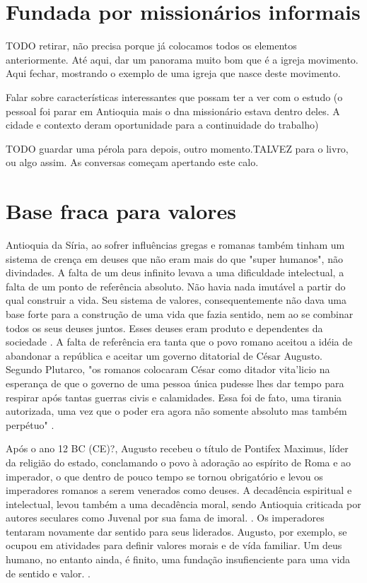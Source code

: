 \documentclass[
	12pt,				%
	openright,			%
	twoside,			%
	a4paper,			%
	english,			%
	french,				%
	spanish,			%
	brazil				%
	]{abntex2}
\begin{document}
\section{Fundada por missionários informais}
TODO retirar, não precisa porque já colocamos todos os elementos anteriormente. Até aqui, dar um panorama muito bom que é a igreja movimento. Aqui fechar, mostrando o exemplo de uma igreja que nasce deste movimento.

Falar sobre características interessantes que possam ter a ver com o estudo
(o pessoal foi parar em Antioquia mais o dna missionário estava dentro deles. A cidade e contexto deram oportunidade para a continuidade do trabalho)

TODO guardar uma pérola para depois, outro momento.TALVEZ para o livro, ou algo assim. As conversas começam apertando este calo.
\section{Base fraca para valores}

Antioquia da Síria, ao sofrer influências gregas e romanas também tinham um sistema de crença em deuses que não eram mais do que "super humanos", não divindades. A falta de um deus infinito levava a uma dificuldade intelectual, a falta de um ponto de referência absoluto. Não havia nada imutável a partir do qual construir a vida. Seu sistema de valores, consequentemente não dava uma base forte para a construção de uma vida que fazia sentido, nem ao se combinar todos os seus deuses juntos. Esses deuses eram produto e dependentes da sociedade \cite[19]{schaeffer}. A falta de referência era tanta que o povo romano aceitou a idéia de abandonar a república e aceitar um governo ditatorial de César Augusto. Segundo Plutarco, "os romanos colocaram César como ditador vita'licio na esperança de que o governo de uma pessoa única pudesse lhes dar tempo para respirar após tantas guerras civis e calamidades. Essa foi de fato, uma tirania autorizada, uma vez que o poder era agora não somente absoluto mas também perpétuo" \cite[19]{schaeffer}.

Após o ano 12 BC (CE)?, Augusto recebeu o título de Pontifex Maximus, líder da religião do estado, conclamando o povo à adoração ao espírito de Roma e ao imperador, o que dentro de pouco tempo se tornou obrigatório e levou os imperadores romanos a serem venerados como deuses. A decadência espiritual e intelectual, levou também a uma decadência moral, sendo Antioquia criticada por autores seculares como Juvenal por sua fama de imoral. \cite[166]{green}. Os imperadores tentaram novamente dar sentido para seus liderados. Augusto, por exemplo, se ocupou em atividades para definir valores morais e de vída familiar. Um deus humano, no entanto ainda, é finito, uma fundação insufienciente para uma vida de sentido e valor. \cite[20]{schaeffer}. 
\end{document}
